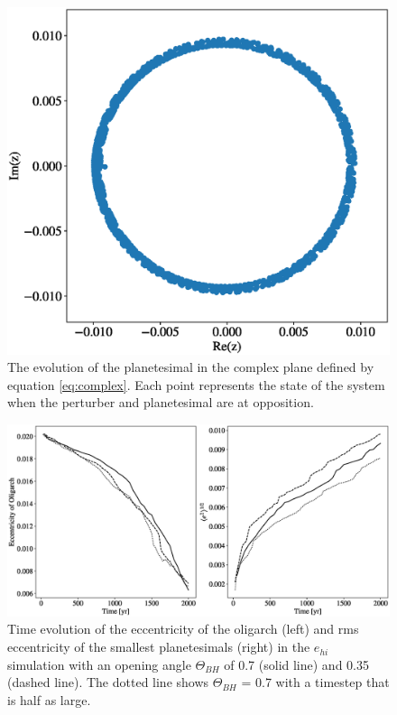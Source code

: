 \begin{figure}
    \includegraphics[width=\columnwidth]{figures/plSS/threebody_complex.eps}
    \caption{The evolution of the planetesimal in the complex plane defined by equation \ref{eq:complex}. Each point represents 
    the state of the system when the perturber and planetesimal are at opposition.}
    \label{fig:threebody}
\end{figure}

\begin{figure}
    \includegraphics[width=\textwidth]{figures/plSS/theta_test.eps}
    \caption{Time evolution of the eccentricity of the oligarch (left) and rms eccentricity of the smallest planetesimals (right) in the 
    $e_{hi}$ simulation with an opening angle $\Theta_{BH}$ of 0.7 (solid line) and 0.35 (dashed line). The dotted line shows 
    $\Theta_{BH}$ = 0.7 with a timestep that is half as large.}
    \label{fig:theta_test}
\end{figure}

